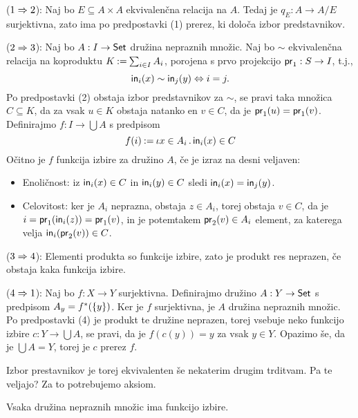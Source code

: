 \begin{dokaz}
  ($1 \lthen 2$):
  Naj bo $E \subseteq A \times A$ ekvivalenčna relacija na $A$. Tedaj je $q_E : A \to A/E$
  surjektivna, zato ima po predpostavki (1) prerez, ki določa izbor predstavnikov.

  ($2 \lthen 3$):
  Naj bo $A : I \to \Set$ družina nepraznih množic. Naj bo $\sim$ ekvivalenčna relacija
  na koproduktu $K \defeq \sum_{i \in I} A_i$, porojena s prvo projekcijo $\fst : S \to I$, t.j.,
  \begin{equation*}
    \inj[i](x) \sim \inj[j](y) \liff i = j.
  \end{equation*}
  Po predpostavki (2) obstaja izbor predstavnikov za $\sim$, se pravi taka množica $C \subseteq K$, da
  za vsak $u \in K$ obstaja natanko en $v \in C$, da je $\fst(u) = \fst(v)$. Definirajmo $f : I \to
  \bigcup A$ s predpisom
  \begin{equation*}
    f(i) \defeq \descr{x \in A_i} \inj[i](x) \in C
  \end{equation*}
  Očitno je $f$ funkcija izbire za družino $A$, če je izraz na desni veljaven:
  \begin{itemize}
  \item Enoličnost: iz $\inj[i](x) \in C$ in $\inj[i](y) \in C$ sledi $\inj[i](x) = \inj[j](y)$.
  \item Celovitost: ker je $A_i$ neprazna, obstaja $z \in A_i$, torej obstaja $v \in C$, da je
    $i = \fst(\inj[i](z)) = \fst(v)$, in je potemtakem $\snd(v) \in A_i$ element, za katerega velja
    $\inj[i](\snd(v)) \in C$.
  \end{itemize}

  ($3 \lthen 4$):
  Elementi produkta so funkcije izbire, zato je produkt res neprazen, če obstaja
  kaka funkcija izbire.

  ($4 \lthen 1$):
  Naj bo $f : X \to Y$ surjektivna. Definirajmo družino $A : Y \to \Set$ s
  predpisom $A_y = \invimg{f}(\set{y})$. Ker je $f$ surjektivna, je $A$ družina nepraznih
  množic. Po predpostavki (4) je produkt te družine neprazen, torej vsebuje neko
  funkcijo izbire $c : Y \to \bigcup A$, se pravi, da je $f(c(y)) = y$ za vsak $y \in Y$.
  Opazimo še, da je $\bigcup A = Y$, torej je $c$ prerez $f$.
\end{dokaz}

Izbor prestavnikov je torej ekvivalenten še nekaterim drugim trditvam. Pa te veljajo? Za
to potrebujemo aksiom.

\begin{aksiom}
  Vsaka družina nepraznih množic ima funkcijo izbire.
\end{aksiom}

